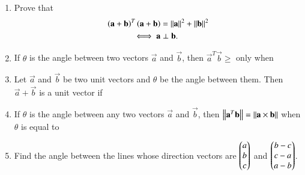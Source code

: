 \begin{enumerate}[label=\arabic*.,ref=\thesubsection.\theenumi]
\begin{enumerate}[itemsep = 2pt]
\end{enumerate}
\item Prove that 
\begin{align}
\left(\mathbf{a}+\mathbf{b}\right)^T\left(\mathbf{a}+\mathbf{b}\right) &= \left\lVert\mathbf{a}\right\rVert^2+\left\lVert\mathbf{b}\right\rVert^2
\\
\iff \mathbf{a}&\perp\mathbf{b}.
\end{align}
\item If $\theta$ is the angle between two vectors $\vec{a}$ and $\vec{b}$, then $\vec{a}^T\vec{b} \ge $ only when 
\begin{enumerate}[itemsep = 2pt]
\end{enumerate}
\item Let $\vec{a}$ and $\vec{b}$ be two unit vectors and $\theta$ be the angle between them.  Then $\vec{a}+\vec{b}$ is a unit vector if 
\begin{enumerate}[itemsep = 2pt]
\end{enumerate}
\item If $\theta$ is the angle between any two vectors $\vec{a}$ and $\vec{b}$, then 
$\left\lVert\mathbf{a}^T\mathbf{b}\right\rVert = \left\lVert\mathbf{a} \times \mathbf{b}\right\rVert$ when $\theta$ is equal to 
\begin{enumerate}[itemsep = 2pt]
\end{enumerate}
\item Find the angle between the lines whose direction vectors are $\begin{pmatrix}a\\b\\c\end{pmatrix}$ and $\begin{pmatrix}b-c\\c-a\\a-b\end{pmatrix}$.

\end{enumerate}
